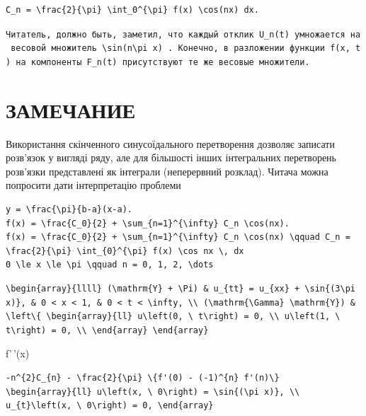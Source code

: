 \documentclass[
  ukrainian,
]{article}
\begin{document}
\begin{verbatim}
C_n = \frac{2}{\pi} \int_0^{\pi} f(x) \cos(nx) dx.
\end{verbatim}

\texttt{Читатель,\ должно\ быть,\ заметил,\ что\ каждый\ отклик\ \textquotesingle{}U\_n(t)\textquotesingle{}\ умножается\ на\ весовой\ множитель\ \textquotesingle{}\textbackslash{}sin(n\textbackslash{}pi\ x)\textquotesingle{}\ .\ Конечно,\ в\ разложении\ функции\ \textquotesingle{}f(x,\ t)\textquotesingle{}\ на\ компоненты\ \textquotesingle{}F\_n(t)\textquotesingle{}\ присутствуют\ те\ же\ весовые\ множители.}

\section{ЗАМЕЧАНИЕ}\label{ux437ux430ux43cux435ux447ux430ux43dux438ux435}

Використання скінченного синусоїдального перетворення дозволяє записати
розв'язок у вигляді ряду, але для більшості інших інтегральних
перетворень розв'язки представлені як інтеграли (неперервний розклад).
Читача можна попросити дати інтерпретацію проблеми

\begin{verbatim}
y = \frac{\pi}{b-a}(x-a).
f(x) = \frac{C_0}{2} + \sum_{n=1}^{\infty} C_n \cos(nx).
f(x) = \frac{C_0}{2} + \sum_{n=1}^{\infty} C_n \cos(nx) \qquad C_n = \frac{2}{\pi} \int_{0}^{\pi} f(x) \cos nx \, dx
0 \le x \le \pi \qquad n = 0, 1, 2, \dots
\end{verbatim}

\begin{verbatim}
\begin{array}{llll} (\mathrm{Y} + \Pi) & u_{tt} = u_{xx} + \sin{(3\pi x)}, & 0 < x < 1, & 0 < t < \infty, \\ (\mathrm{\Gamma} \mathrm{Y}) & \left\{ \begin{array}{ll} u\left(0, \ t\right) = 0, \\ u\left(1, \ t\right) = 0, \\ \end{array} \end{array}
\end{verbatim}

f'\,'(x)

\begin{verbatim}
-n^{2}C_{n} - \frac{2}{\pi} \{f'(0) - (-1)^{n} f'(n)\}
\begin{array}{ll} u\left(x, \ 0\right) = \sin{(\pi x)}, \\ u_{t}\left(x, \ 0\right) = 0, \end{array}
\end{verbatim}
\end{document}
